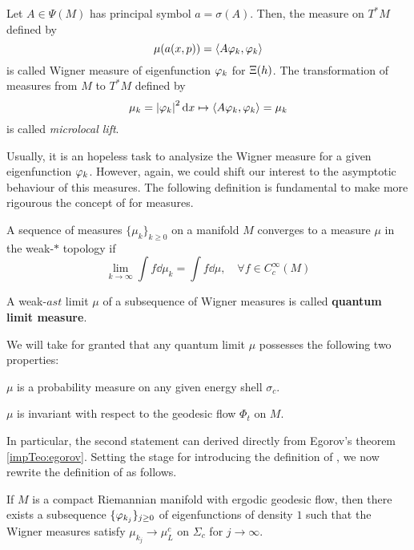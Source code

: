 \begin{defin}
\label{def:Wigner_measure}
Let $A\in\Psi(M)$ has principal symbol $a=\sigma(A)$. Then, the measure on $T^{\ast}M$ defined by
\[
\mu(a(x,p))=\left< A\varphi_{k},\varphi_{k}\right>
\]
is called Wigner measure of eigenfunction $\varphi_{k}$ for $\Xi(h)$. The transformation of measures from $M$ to $T^{\ast}M$ defined by
\[
\mu_{k}=\left| \varphi_{k}\right|^{2}\mathop{}\!\mathrm{d} x\mapsto\left< A\varphi_{k},\varphi_{k}\right>=\mu_{k}
\]
is called \emph{microlocal lift}.
\end{defin}

Usually, it is an hopeless task to analysize the Wigner measure for a given eigenfunction $\varphi_{k}$. However, again, we could shift our interest to the asymptotic behaviour of this measures. The following definition is fundamental to make more rigourous the concept of  for measures.

\begin{defin}
\label{def:weak_convergence_star}
A sequence of measures $\{\mu_{k}\}_{k\geq0}$ on a manifold $M$ converges to a measure $\mu$ in the weak-$\ast$ topology if 
\[
\lim_{k\to\infty}\int f\dd\mu_{k}=\int f\dd\mu,\quad\forall f\in C^{\infty}_{c}(M)
\]
\end{defin}

\begin{defin}
\label{def:quantum_limit_measure}
A weak-$ast$ limit $\mu$ of a subsequence of Wigner measures is called \textbf{quantum limit measure}.
\end{defin}

We will take for granted that any quantum limit $\mu$ possesses the following two properties:
\begin{compactitem}
\item $\mu$ is a probability measure on any given energy shell $\sigma_{c}$.
\item $\mu$ is invariant with respect to the geodesic flow $\Phi_{t}$ on $M$.
\end{compactitem} 

In particular, the second statement can derived directly from Egorov's theorem \ref{impTeo:egorov}. Setting the stage for introducing the definition of \QUE, we now rewrite the definition of \QE as follows.
\begin{defin}
\label{def:new_def_qe}
If $M$ is a compact Riemannian manifold with ergodic geodesic flow, then there exists a subsequence $\{\varphi_{k_{j}}\}_{j\geq0}$ of eigenfunctions of density $1$ such that the Wigner measures satisfy $\mu_{k_{j}}\to\mu_{L}^{c}$ on $\Sigma_{c}$ for $j\to\infty$. 
\end{defin}

